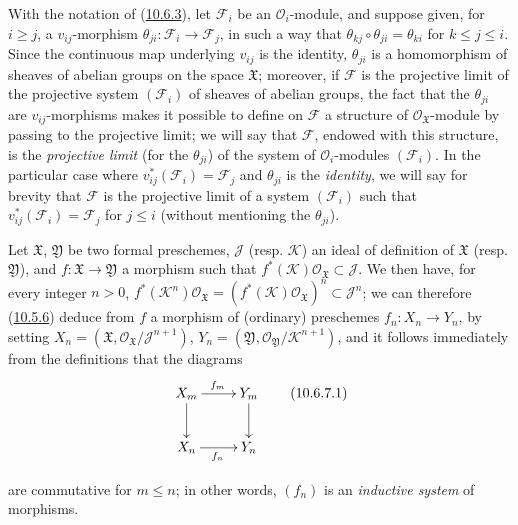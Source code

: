 \begin{remark}[10.6.6]
\label{I.10.6.6}
With the notation of (\hyperref[I.10.6.3]{10.6.3}), let
$\mathscr{F}_i$ be an $\mathscr{O}_i$-module, and suppose given, for
$i\geq j$, a $v_{ij}$-morphism
$\theta_{ji}:\mathscr{F}_i\to\mathscr{F}_j$, in such a way that
$\theta_{kj}\circ\theta_{ji}=\theta_{ki}$ for $k\leq j\leq i$.
Since the continuous map underlying $v_{ij}$ is the identity,
$\theta_{ji}$ is a homomorphism of sheaves of abelian groups on
the space $\mathfrak{X}$; moreover, if $\mathscr{F}$ is the projective
limit of the projective system $(\mathscr{F}_i)$ of sheaves of abelian
groups, the fact that the $\theta_{ji}$ are $v_{ij}$-morphisms
makes it possible to define on $\mathscr{F}$ a structure of
$\mathscr{O}_{\mathfrak{X}}$-module by passing to the projective limit;
we will say that $\mathscr{F}$, endowed with this structure, is the
\emph{projective limit} (for the $\theta_{ji}$) of the system of
$\mathscr{O}_i$-modules $(\mathscr{F}_i)$. In the particular case where
$v_{ij}^*(\mathscr{F}_i)=\mathscr{F}_j$ and $\theta_{ji}$ is
the \emph{identity}, we will say for brevity that $\mathscr{F}$ is the
projective limit of a system $(\mathscr{F}_i)$ such that
$v_{ij}^*(\mathscr{F}_i)=\mathscr{F}_j$ for $j\leq i$ (without
mentioning the $\theta_{ji}$).
\end{remark}

\begin{env}[10.6.7]
\label{I.10.6.7}
Let $\mathfrak{X}$, $\mathfrak{Y}$ be two formal preschemes,
$\mathscr{J}$ (resp. $\mathscr{K}$) an ideal of definition of
$\mathfrak{X}$ (resp. $\mathfrak{Y}$), and
$f:\mathfrak{X}\to\mathfrak{Y}$ a morphism such that
$f^*(\mathscr{K})\mathscr{O}_{\mathfrak{X}}\subset\mathscr{J}$. We
then have, for every integer $n>0$,
$f^*(\mathscr{K}^n)\mathscr{O}_{\mathfrak{X}}
=(f^*(\mathscr{K})\mathscr{O}_{\mathfrak{X}})^n
\subset\mathscr{J}^n$; we can therefore
(\hyperref[I.10.5.6]{10.5.6}) deduce from $f$ a morphism of
(ordinary) preschemes $f_n:X_n\to Y_n$, by setting
$X_n=(\mathfrak{X},
\mathscr{O}_{\mathfrak{X}}/\mathscr{J}^{n+1})$,
$Y_n=(\mathfrak{Y},
\mathscr{O}_{\mathfrak{Y}}/\mathscr{K}^{n+1})$, and it follows
immediately from the definitions that the diagrams
\[
  \label{I.10.6.7.1}
  \xymatrix{
    X_m\ar[r]^{f_m}\ar[d] &
    Y_m\ar[d]\\
    X_n\ar[r]_{f_n} &
    Y_n
  }
  \tag{10.6.7.1}
\]


are commutative for $m\leq n$; in other words, $(f_n)$ is an
\emph{inductive system} of morphisms.
\end{env}

